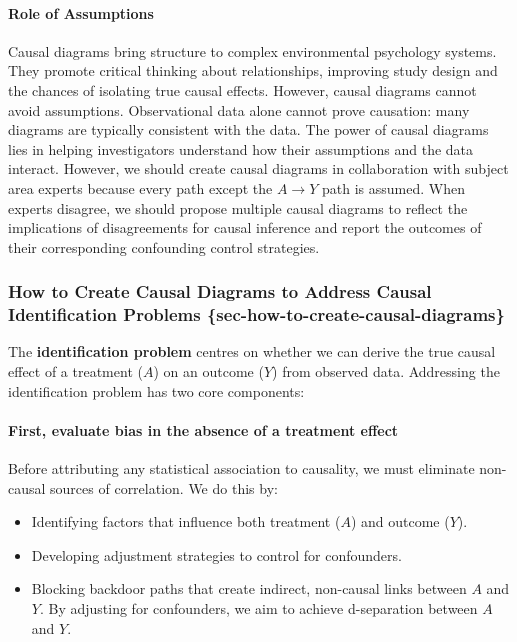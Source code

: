 \documentclass[
  singlecolumn]{article}
\let\oldparagraph\paragraph
\renewcommand{\paragraph}[1]{\oldparagraph{#1}\mbox{}}
\providecommand{\tightlist}{%
  \setlength{\itemsep}{0pt}\setlength{\parskip}{0pt}}\usepackage{longtable,booktabs,array}
\begin{document}
\paragraph{Role of Assumptions}\label{role-of-assumptions}

Causal diagrams bring structure to complex environmental psychology
systems. They promote critical thinking about relationships, improving
study design and the chances of isolating true causal effects. However,
causal diagrams cannot avoid assumptions. Observational data alone
cannot prove causation: many diagrams are typically consistent with the
data. The power of causal diagrams lies in helping investigators
understand how their assumptions and the data interact. However, we
should create causal diagrams in collaboration with subject area experts
because every path except the \(A\to Y\) path is assumed. When experts
disagree, we should propose multiple causal diagrams to reflect the
implications of disagreements for causal inference and report the
outcomes of their corresponding confounding control strategies.

\subsubsection{How to Create Causal Diagrams to Address Causal
Identification Problems
\{sec-how-to-create-causal-diagrams\}}\label{how-to-create-causal-diagrams-to-address-causal-identification-problems-sec-how-to-create-causal-diagrams}

The \textbf{identification problem} centres on whether we can derive the
true causal effect of a treatment (\(A\)) on an outcome (\(Y\)) from
observed data. Addressing the identification problem has two core
components:

\paragraph{First, evaluate bias in the absence of a treatment
effect}\label{first-evaluate-bias-in-the-absence-of-a-treatment-effect}

Before attributing any statistical association to causality, we must
eliminate non-causal sources of correlation. We do this by:

\begin{itemize}
\tightlist
\item
  Identifying factors that influence both treatment (\(A\)) and outcome
  (\(Y\)).
\item
  Developing adjustment strategies to control for confounders.
\item
  Blocking backdoor paths that create indirect, non-causal links between
  \(A\) and \(Y\). By adjusting for confounders, we aim to achieve
  d-separation between \(A\) and \(Y\).
\end{itemize}
\end{document}
